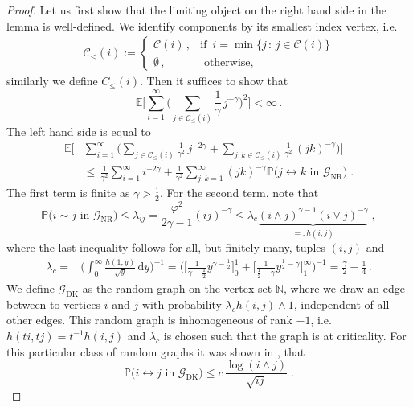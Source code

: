 \documentclass[12pt,a4paper]{article}
\numberwithin{equation}{section}
\begin{document}
\begin{proof}
Let us first show that the limiting object on the right hand side in the lemma is well-defined. 
We identify components by its smallest index vertex, i.e. 
\begin{align*}
    \mathcal C_{\le}(i):=\left\{\begin{matrix}
          \mathcal C(i)\,, & \text{if } \,i=\min\{j\,:\,j\in \mathcal C(i)\}  \\
            \emptyset\,, & \text{ otherwise,}
    \end{matrix}\right.
\end{align*} similarly we define $C_{\le}(i)$. 
Then it suffices to show that
$$\mathbb E\bigg[\sum_{i=1}^\infty \Big(\sum_{j\in \mathcal C_{\le}(i)}\frac{1}{\gamma}\, j^{-\gamma}\Big)^2\bigg]< \infty \,.$$
The left hand side is equal to
\begin{align*}
   \mathbb E\bigg[ & \sum_{i=1}^\infty\Big(\sum_{j\in \mathcal C_{\le}(i)}\frac{1}{\gamma^2}\, j^{-2\gamma}+\sum_{j,k\in \mathcal C_{\le}(i)}\frac{1}{\gamma^2}\, (jk)^{-\gamma}\Big)\bigg] \\
   & \le \, \frac{1}{\gamma^2}\sum_{i=1}^\infty i^{-2\gamma}+ \frac{1}{\gamma^2}  \sum_{j,k=1}^\infty (jk)^{-\gamma} \mathbb{P}\big( j\leftrightarrow  k\text{ in } \mathscr G _{\text{NR}}\big)\;.
\end{align*}
The first term is finite as $\gamma>\tfrac12$. For the second term, note that
$$\mathbb{P}\big( i\sim   j\text{ in } \mathscr G _\text{NR}\big)\le \lambda_{ij}=\frac{\varphi^2}{2\gamma-1}(ij)^{-\gamma} \le \lambda_c \underbrace{ (i \wedge j)^{\gamma-1}(i \vee j)^{-\gamma}}_{=:h(i,j)}\;,$$
where the last inequality follows for all, but finitely many, tuples $(i,j)$ and %
\begin{align*}
    \lambda_c = & \bigg(\int_0^\infty \frac{h(1,y)}{\sqrt{y}}\,\text{d}y\bigg)^{-1}=\bigg(\Big[\frac{1}{\gamma-\frac12}y^{\gamma-\frac12}\Big]_0^1+\Big[\frac{1}{\frac12-\gamma}y^{\frac12-\gamma}\Big]_1^\infty\bigg)^{-1}
    =\frac{\gamma}{2}-\frac{1}{4}\,.
\end{align*}
We define $\mathscr G _{\text{DK}}$ as the random graph on the vertex set $\mathbb N$, where we draw an edge between to vertices $i$ and $j$ with probability $\lambda_c h(i,j)\wedge 1$, independent of all other edges. This random graph is inhomogeneous of rank $-1$, i.e. $h(ti,tj)=t^{-1}h(i,j)$ and $\lambda_c$ is chosen such that the graph is at criticality. For this particular class of random graphs it was shown in \cite{YZ}, that 
$$\mathbb{P}\big( i\leftrightarrow     j\text{ in } \mathscr G _{\text{DK}}\big)\le c \,\frac{\log(i\wedge j)}{\sqrt{ij}}\;.$$

\end{proof}
\end{document}
